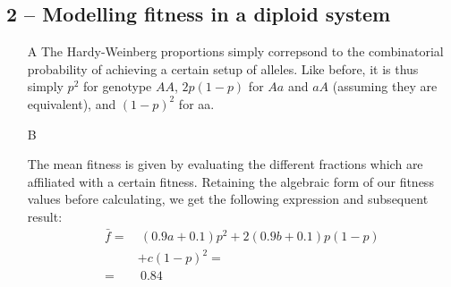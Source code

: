 \documentclass[10pt]{article}\usepackage[]{graphicx}\usepackage[]{color}
\theoremstyle{plain}
\begin{document}
\begin{multicols*}{2}
\subsection*{2 -- Modelling fitness in a diploid system}
\begin{enumerate}
  \item[A] The Hardy-Weinberg proportions simply correpsond to the combinatorial
    probability of achieving a certain setup of alleles. Like before, it is
    thus simply $p^2$ for genotype $AA$, $2p(1-p)$ for $Aa$ and $aA$ (assuming they are equivalent), and $(1-p)^2$
    for aa. 
  \item[B] 
    
  The mean fitness is given by evaluating the different fractions which are
affiliated with a certain fitness. Retaining the algebraic form of our fitness
values before calculating, we get the following expression and subsequent result:
    \begin{align*}
      \bar f =&~(0.9a + 0.1)p^2 + 2(0.9b + 0.1)p(1-p) \\&+ c(1-p)
      ^2 = \\
      =&~0.84
    \end{align*}  



\end{enumerate}
\end{multicols*}
\end{document}
